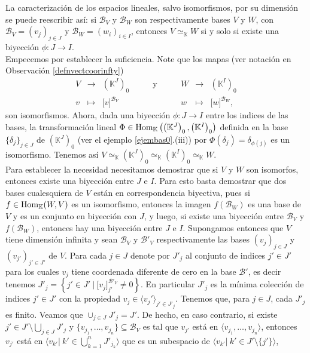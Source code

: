 \begin{obs}\label{dimiso}
La caracterizaci\'on de los espacios lineales, salvo isomorfismos, por su dimensi\'on se puede reescribir as\'i: si $\mathcal{B}_V$ y $\mathcal{B}_W$ son respectivamente bases $V$ y $W$, con $\mathcal{B}_V=(v_j)_{j\in J}$ y $\mathcal{B}_W=(w_i)_{i\in I}$, entonces $V\simeq_{\mathbb{K}} W$ si y solo si existe una biyecci\'on $\phi:J\rightarrow I$.\\
Empecemos por establecer la suficiencia. Note que los mapas (ver notaci\'on en Observaci\'on \ref{defnvectcoorinfty})
\[
\begin{array}{rclcrcl}
V & \longrightarrow & \left(\mathbb{K}^{J}\right)_0 &\qquad\textrm{y}\qquad& W & \longrightarrow & \left(\mathbb{K}^I\right)_0 \\
v & \longmapsto & \Big[v\Big]^{\mathcal{B}_V} &\qquad& w & \longmapsto & \Big[w\Big]^{\mathcal{B}_W}, 
\end{array}
\]
son isomorfismos. Ahora, dada una biyecci\'on $\phi:J\rightarrow I$ entre los indices de las bases, la transformaci\'on lineal $\Phi\in\operatorname{Hom}_{\mathbb{K}}\left(\left(\mathbb{K}^J\right)_0,\left(\mathbb{K}^I\right)_0\right)$ definida en la base $\{\delta_j\}_{j\in J}$ de $\left(\mathbb{K}^J\right)_0$ (ver el ejemplo \ref{ejembas0}.(iii)) por $\Phi(\delta_j)=\delta_{\phi(j)}$ es un isomorfismo. Tenemos as\'i $V\simeq_{\mathbb{K}}\left(\mathbb{K}^J\right)_0\simeq_{\mathbb{K}}\left(\mathbb{K}^I\right)_0\simeq_{\mathbb{K}} W$.\\
Para establecer la necesidad necesitamos demostrar que si $V$ y  $W$ son isomorfos, entonces existe una biyecci\'on entre $J$ e $I$. Para esto basta demostrar que dos bases cualesquiera de $V$ est\'an en correspondencia biyectiva, pues si $f\in\operatorname{Hom}_{\mathbb{K}}(W,V)$ es un isomorfismo, entonces la imagen $f(\mathcal{B}_W)$ es una base de $V$ y es un conjunto en biyecci\'on con $J$, y luego, si existe una biyecci\'on entre $\mathcal{B}_V$ y $f\left(\mathcal{B}_W\right)$, entonces hay una biyecci\'on entre $J$ e $I$. Supongamos entonces que $V$ tiene dimensi\'on infinita y sean $\mathcal{B}_V$ y $\mathcal{B}'_V$ respectivamente las bases $(v_j)_{j\in J}$ y $(v_{j'})_{j'\in J'}$ de $V$. Para cada $j\in J$ denote por $J'_j$ al conjunto de indices $j'\in J'$ para los cuales $v_j$ tiene coordenada diferente de cero en la base $\mathcal{B}'$, es decir tenemos $J'_j=\left\{j'\in J'\ |\ \Big[v_j\Big]^{\mathcal{B}'_V}_{j'}\ne 0\right\}$. En particular $J'_j$ es la m\'inima colecci\'on de indices $j'\in J'$ con la propiedad $v_j\in\langle v_j'\rangle_{j'\in J'_j}$. Tenemos que, para $j\in J$, cada $J'_j$ es finito. Veamos que $\cup_{j\in J}J'_j=J'$. De hecho, en caso contrario, si existe $j'\in J'\setminus \bigcup_{j\in J}J'_j $ y $\{v_{j_1},\ldots,v_{j_n}\}\subseteq \mathcal{B}_V$ es tal que $v_{j'}$ est\'a en $\langle v_{j_1},\ldots,v_{j_n}\rangle$, entonces $v_{j'}$ est\'a en $\langle v_{k'}|\ k'\in \bigcup_{k=1}^n J'_{j_k} \rangle$ que es un subespacio de $\langle v_{k'}|\ k'\in J'\setminus\{j'\}\rangle$,

\end{obs}
